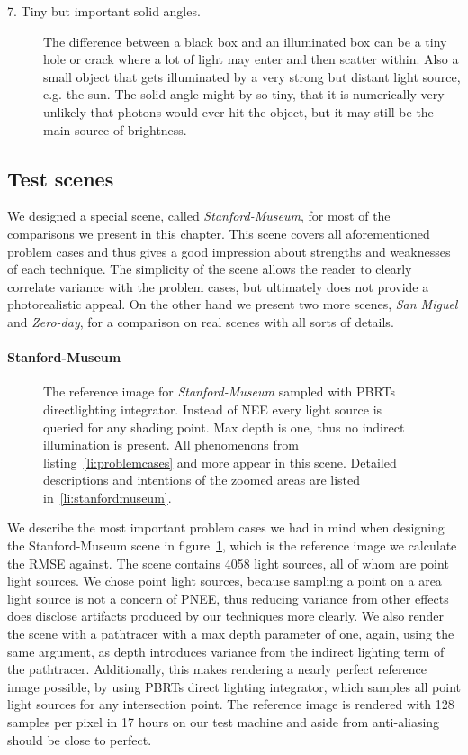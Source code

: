 \begin{description}
    \item[7. Tiny but important solid angles.] The difference between a black box and an illuminated box can be a tiny hole or crack where a lot of light may enter and then scatter within. Also a small object that gets illuminated by a very strong but distant light source, e.g. the sun. The solid angle might by so tiny, that it is numerically very unlikely that photons would ever hit the object, but it may still be the main source of brightness.
\label{li:problemcases}
\end{description} 

\subsection{Test scenes}

We designed a special scene, called \textit{Stanford-Museum}, for most of the comparisons we present in this chapter. This scene covers all aforementioned problem cases and thus gives a good impression about strengths and weaknesses of each technique. The simplicity of the scene allows the reader to clearly correlate variance with the problem cases, but ultimately does not provide a photorealistic appeal. On the other hand we present two more scenes, \textit{San Miguel} and \textit{Zero-day}, for a comparison on real scenes with all sorts of details.

\paragraph{Stanford-Museum}
\label{sec:stanfordmuseum}
\begin{figure}[ht]\centering

\caption{The reference image for \textit{Stanford-Museum} sampled with PBRTs directlighting integrator. Instead of NEE every light source is queried for any shading point. Max depth is one, thus no indirect illumination is present. All phenomenons from listing~\ref{li:problemcases} and more appear in this scene. Detailed descriptions and intentions of the zoomed areas are listed in~\ref{li:stanfordmuseum}.
}
\label{fig:stanfordmuseumref}
\end{figure}

We describe the most important problem cases we had in mind when designing the Stanford-Museum scene in figure~\ref{fig:stanfordmuseumref}, which is the reference image we calculate the RMSE against. The scene contains 4058 light sources, all of whom are point light sources. We chose point light sources, because sampling a point on a area light source is not a concern of PNEE, thus reducing variance from other effects does disclose artifacts produced by our techniques more clearly. We also render the scene with a pathtracer with a max depth parameter of one, again, using the same argument, as depth introduces variance from the indirect lighting term of the pathtracer. Additionally, this makes rendering a nearly perfect reference image possible, by using PBRTs direct lighting integrator, which samples all point light sources for any intersection point. The reference image is rendered with 128 samples per pixel in 17 hours on our test machine and aside from anti-aliasing should be close to perfect. 

